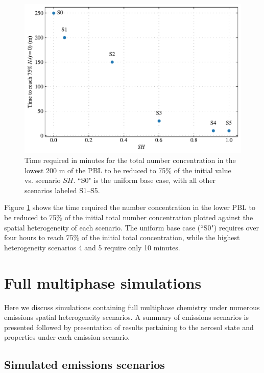 \begin{figure}[t]
  \centering
    \includegraphics[width=\textwidth]{figures/chapter5/ideal-coag/TimeTo75pcnt_vs_SH.pdf}
    \caption{Time required in minutes for the total number concentration in the lowest 200 m of the PBL to be reduced to 75\% of the initial value vs. scenario $SH$. ``S0" is the uniform base case, with all other scenarios labeled S1--S5.}
    \label{fig:numconc-timescales-to-75pcent}
\end{figure}

Figure \ref{fig:numconc-timescales-to-75pcent} shows the time required the number concentration in the lower PBL to be reduced to 75\% of the initial total number concentration plotted against the spatial heterogeneity of each scenario. The uniform base case (``S0") requires over four hours to reach 75\% of the initial total concentration, while the highest heterogeneity scenarios 4 and 5 require only 10 minutes.

\section{Full multiphase simulations}

Here we discuss simulations containing full multiphase chemistry under numerous emissions spatial heterogeneity scenarios. A summary of emissions scenarios is presented followed by presentation of results pertaining to the aerosol state and properties under each emission scenario. 

\subsection{Simulated emissions scenarios}

